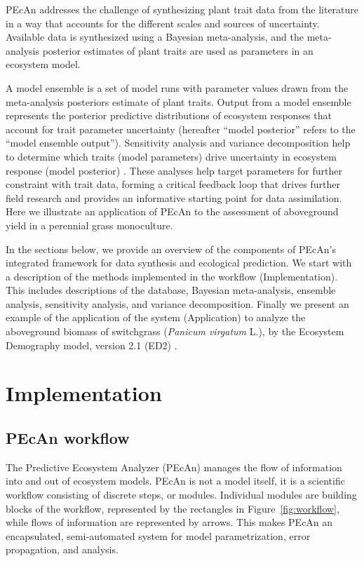 \documentclass[12pt]{article}
\begin{document}
\begin{flushleft}
\begin{spacing}{1.9}
 PEcAn addresses the challenge of synthesizing plant trait data from the literature in a way that accounts for the different scales and sources of uncertainty.
 Available data is synthesized using a Bayesian meta-analysis, and the meta-analysis posterior estimates of plant traits are used as parameters in an ecosystem model.

 A model ensemble is a set of model runs with parameter values drawn from the meta-analysis posteriors estimate of plant traits.
 Output from a model ensemble represents the posterior predictive distributions of ecosystem responses that account for trait parameter uncertainty (hereafter  ``model posterior'' refers to the ``model ensemble output'').
 Sensitivity analysis and variance decomposition help to determine which traits (model parameters) drive uncertainty in ecosystem response (model posterior) \citep{saltelli2008gsa,larocque2008uac}.
 These analyses help target parameters for further constraint with trait data, forming a critical feedback loop that drives further field research and provides an informative starting point for data assimilation.
 Here we illustrate an application of PEcAn to the assessment of aboveground yield in a perennial grass monoculture.

 In the sections below, we provide an overview of the components of PEcAn's integrated framework for data synthesis and ecological prediction. 
 We start with a description of the methods implemented in the workflow (Implementation).
 This includes descriptions of the database, Bayesian meta-analysis, ensemble analysis, sensitivity analysis, and variance decomposition.
 Finally we present an example of the application of the system (Application) to analyze the aboveground biomass of switchgrass (\emph{Panicum virgatum} L.), by the Ecosystem Demography model, version 2.1 (ED2) \citep{medvigy2009mse,moorcroft2001msv}.

\section*{Implementation}
\label{sec:implement}

\subsection*{PEcAn workflow}
  The Predictive Ecosystem Analyzer (PEcAn) manages the flow of information into and out of ecosystem models.%
 PEcAn is not a model itself, it is a scientific workflow consisting of discrete steps, or modules. 
 Individual modules are building blocks of the workflow, represented by the rectangles in Figure~\ref{fig:workflow}, while flows of information are represented by arrows. 
 This makes PEcAn an encapsulated, semi-automated system for model parametrization, error propagation, and analysis.
  

\end{spacing}
\end{flushleft}
\end{document}
